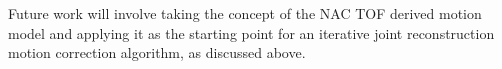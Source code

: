 \documentclass[9pt]{IEEEtran}
\begin{document}
Future work will involve taking the concept of the NAC TOF derived motion model and applying it as the starting point for an iterative joint reconstruction motion correction algorithm, as discussed above.

\ifCLASSOPTIONcaptionsoff
  \newpage
\fi



%
%
%



%
%

\AtNextBibliography{\small}
\printbibliography



\end{document}

